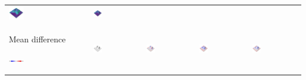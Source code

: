 \documentclass[prodmode,acmtochi]{acmsmall} %
\begin{document}
\begin{table}
{\begin{tabular}{m{} m{} m{} m{} m{}}
\includegraphics[width=0.19\textwidth]{images/render_3d/stdev_regression_difference_series_2.png} &
\includegraphics[width=0.19\textwidth]{images/render_3d/stdev_regression_difference_series_3.png}\\
%
Mean difference \par \vspace{0.5em} \includegraphics[width=0.19\textwidth]{images/legends/diff_legend.pdf} & 
\includegraphics[width=0.19\textwidth]{images/render_3d/dem_difference_1.png} &
\includegraphics[width=0.19\textwidth]{images/render_3d/mean_dem_regression_difference_1.png} &
\includegraphics[width=0.19\textwidth]{images/render_3d/mean_dem_regression_difference_2.png} &
\includegraphics[width=0.19\textwidth]{images/render_3d/mean_dem_regression_difference_3.png}\\

\end{tabular}}
\end{table}
\end{document}
